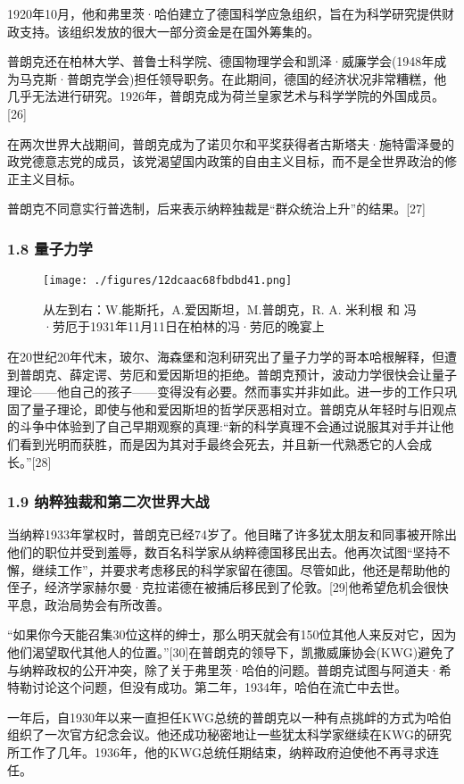 1920年10月，他和弗里茨·哈伯建立了德国科学应急组织，旨在为科学研究提供财政支持。该组织发放的很大一部分资金是在国外筹集的。

普朗克还在柏林大学、普鲁士科学院、德国物理学会和凯泽·威廉学会(1948年成为马克斯·普朗克学会)担任领导职务。在此期间，德国的经济状况非常糟糕，他几乎无法进行研究。1926年，普朗克成为荷兰皇家艺术与科学学院的外国成员。[26]

在两次世界大战期间，普朗克成为了诺贝尔和平奖获得者古斯塔夫·施特雷泽曼的政党德意志党的成员，该党渴望国内政策的自由主义目标，而不是全世界政治的修正主义目标。

普朗克不同意实行普选制，后来表示纳粹独裁是“群众统治上升”的结果。[27]

\subsubsection{1.8 量子力学}
\begin{figure}[ht]
\centering
\texttt{[image: ./figures/12dcaac68fbdbd41.png]}
\caption{从左到右：W.能斯托，A.爱因斯坦，M.普朗克，R. A. 米利根 和 冯·劳厄于1931年11月11日在柏林的冯·劳厄的晚宴上} \label{fig_Max_5}
\end{figure}
在20世纪20年代末，玻尔、海森堡和泡利研究出了量子力学的哥本哈根解释，但遭到普朗克、薛定谔、劳厄和爱因斯坦的拒绝。普朗克预计，波动力学很快会让量子理论——他自己的孩子——变得没有必要。然而事实并非如此。进一步的工作只巩固了量子理论，即使与他和爱因斯坦的哲学厌恶相对立。普朗克从年轻时与旧观点的斗争中体验到了自己早期观察的真理:“新的科学真理不会通过说服其对手并让他们看到光明而获胜，而是因为其对手最终会死去，并且新一代熟悉它的人会成长。”[28]

\subsubsection{1.9 纳粹独裁和第二次世界大战}
当纳粹1933年掌权时，普朗克已经74岁了。他目睹了许多犹太朋友和同事被开除出他们的职位并受到羞辱，数百名科学家从纳粹德国移民出去。他再次试图“坚持不懈，继续工作”，并要求考虑移民的科学家留在德国。尽管如此，他还是帮助他的侄子，经济学家赫尔曼·克拉诺德在被捕后移民到了伦敦。[29]他希望危机会很快平息，政治局势会有所改善。

“如果你今天能召集30位这样的绅士，那么明天就会有150位其他人来反对它，因为他们渴望取代其他人的位置。”[30]在普朗克的领导下，凯撒威廉协会(KWG)避免了与纳粹政权的公开冲突，除了关于弗里茨·哈伯的问题。普朗克试图与阿道夫·希特勒讨论这个问题，但没有成功。第二年，1934年，哈伯在流亡中去世。

一年后，自1930年以来一直担任KWG总统的普朗克以一种有点挑衅的方式为哈伯组织了一次官方纪念会议。他还成功秘密地让一些犹太科学家继续在KWG的研究所工作了几年。1936年，他的KWG总统任期结束，纳粹政府迫使他不再寻求连任。

